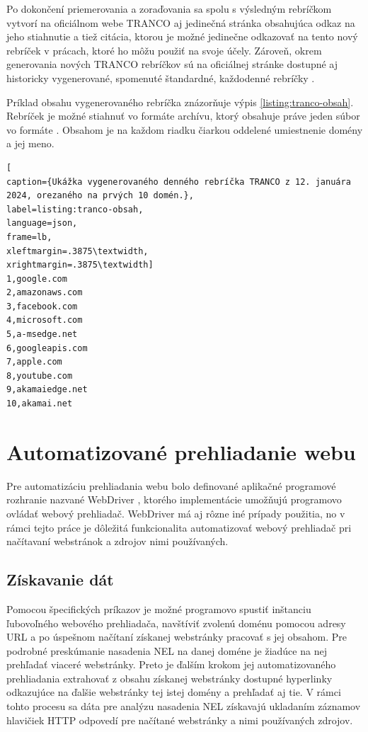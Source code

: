\pagebreak

Po dokončení priemerovania a zoraďovania sa spolu s výsledným rebríčkom vytvorí na oficiálnom webe TRANCO aj jedinečná stránka obsahujúca odkaz na jeho stiahnutie a tiež citácia, 
ktorou je možné jedinečne odkazovať na tento nový rebríček v prácach, ktoré ho môžu použiť na svoje účely.
Zároveň, okrem generovania nových TRANCO rebríčkov sú na oficiálnej stránke dostupné aj historicky vygenerované, spomenuté štandardné, každodenné rebríčky \cite{tranco-homepage}.

Príklad obsahu vygenerovaného rebríčka znázorňuje výpis \ref{listing:tranco-obsah}.
Rebríček je možné stiahnuť vo formáte  archívu, ktorý obsahuje práve jeden súbor vo formáte . 
Obsahom je na každom riadku čiarkou oddelené umiestnenie domény a jej meno.

\begin{center}
\centering
\begin{lstlisting}[
caption={Ukážka vygenerovaného denného rebríčka TRANCO z 12. januára 2024, orezaného na prvých 10 domén.},
label=listing:tranco-obsah, 
language=json, 
frame=lb,
xleftmargin=.3875\textwidth, 
xrightmargin=.3875\textwidth]
1,google.com
2,amazonaws.com
3,facebook.com
4,microsoft.com
5,a-msedge.net
6,googleapis.com
7,apple.com
8,youtube.com
9,akamaiedge.net
10,akamai.net

\end{lstlisting}
\end{center}


\section{Automatizované prehliadanie webu}
\label{selenium}

Pre automatizáciu prehliadania webu bolo definované aplikačné programové rozhranie nazvané WebDriver \cite{crawling-webdriver}, ktorého implementácie umožňujú programovo ovládať webový prehliadač.
WebDriver má aj rôzne iné prípady použitia, no v rámci tejto práce je dôležitá funkcionalita automatizovať webový prehliadač pri načítavaní webstránok a zdrojov nimi používaných. 

\subsection{Získavanie dát}

Pomocou špecifických príkazov je možné programovo spustiť inštanciu ľubovoľného webového prehliadača, navštíviť zvolenú doménu pomocou adresy URL a po úspešnom načítaní získanej webstránky pracovať s jej obsahom.
Pre podrobné preskúmanie nasadenia NEL na danej doméne je žiadúce na nej prehľadať viaceré webstránky.
Preto je ďalším krokom jej automatizovaného prehliadania extrahovať z obsahu získanej webstránky dostupné hyperlinky odkazujúce na ďalšie webstránky tej istej domény a prehľadať aj tie.
V rámci tohto procesu sa dáta pre analýzu nasadenia NEL získavajú ukladaním záznamov hlavičiek HTTP odpovedí pre načítané webstránky a nimi používaných zdrojov.

